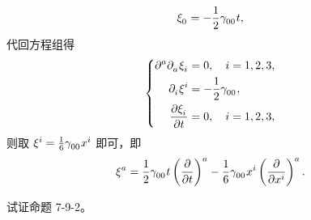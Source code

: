 \begin{xiti}
\begin{zm}
\begin{equation*}
				\tensor{\xi}{_0} = - \frac{1}{2} \tensor{\gamma}{_0_0} t,
			\end{equation*}
			代回方程组得
			\begin{equation*}
				\left\{
					\begin{aligned}
						\tensor{\partial}{^a} \tensor{\partial}{_a} \tensor{\xi}{_i} &= 0 \qc i=1,2,3,\\
						\tensor{\partial}{_i} \tensor{\xi}{^i} &= - \frac{1}{2} \tensor{\gamma}{_0_0},\\
						\pdv{\tensor{\xi}{_i}}{t} &= 0 \qc i=1,2,3,
					\end{aligned}
				\right.
			\end{equation*}
			则取 $\tensor{\xi}{^i} = \frac{1}{6} \tensor{\gamma}{_0_0} x^i$ 即可，即
			\begin{equation*}
				\tensor{\xi}{^a} = \frac{1}{2} \tensor{\gamma}{_0_0} t \tensor{\left( \pdv{t} \right)}{^a} - \frac{1}{6} \tensor{\gamma}{_0_0} x^i \tensor{\left( \pdv{x^i} \right)}{^a}.
			\end{equation*}
		\end{zm}

	\item 试证命题 7-9-2。
	

\end{xiti}
